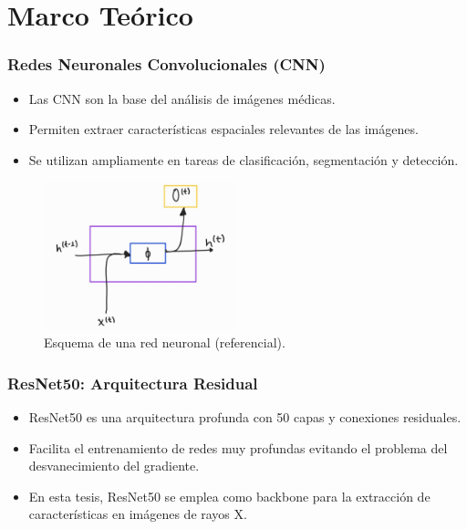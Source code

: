 
\section{Marco Teórico}

\begin{frame}
\frametitle{Redes Neuronales Convolucionales (CNN)}
\begin{itemize}
    \item Las CNN son la base del análisis de imágenes médicas.
    \item Permiten extraer características espaciales relevantes de las imágenes.
    \item Se utilizan ampliamente en tareas de clasificación, segmentación y detección.
\end{itemize}
\begin{figure}[ht!]
    \centering
    \includegraphics[width=0.5\textwidth]{../Chapters/2. Transformer/Figures/rnn/rnn_cell.jpg}
    \caption{Esquema de una red neuronal (referencial).}
\end{figure}
\end{frame}

\begin{frame}
\frametitle{ResNet50: Arquitectura Residual}
\begin{itemize}
    \item ResNet50 es una arquitectura profunda con 50 capas y conexiones residuales.
    \item Facilita el entrenamiento de redes muy profundas evitando el problema del desvanecimiento del gradiente.
    \item En esta tesis, ResNet50 se emplea como backbone para la extracción de características en imágenes de rayos X.
\end{itemize}
\end{frame}

